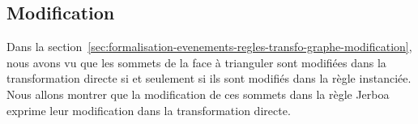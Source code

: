 



\subsection{Modification}

Dans la section~\ref{sec:formalisation-evenements-regles-transfo-graphe-modification}, nous avons vu que les sommets de la face à trianguler sont modifiées dans la transformation directe si et seulement si ils sont modifiés dans la règle instanciée. %
Nous allons montrer que la modification de ces sommets dans la règle Jerboa
exprime leur modification dans la transformation directe. %

